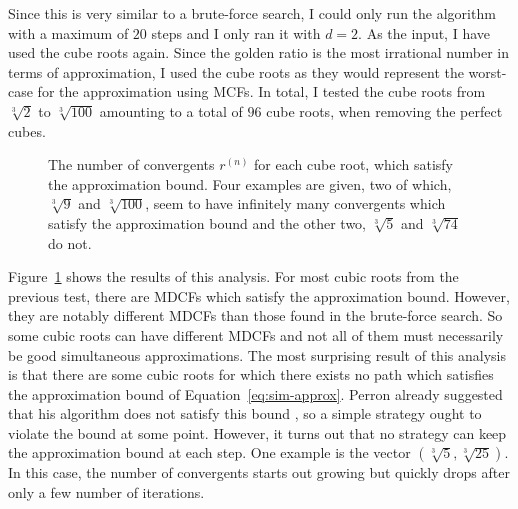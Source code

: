 Since this is very similar to a brute-force search,
I could only run the algorithm with a maximum of $20$ steps
and I only ran it with $d = 2$.
As the input, I have used the cube roots again.
Since the golden ratio is the most irrational number
in terms of approximation,
I used the cube roots as they would represent the worst-case for the
approximation using MCFs.
In total,
I tested the cube roots from $\sqrt[3]{2}$ to $\sqrt[3]{100}$ amounting to a
total of $96$ cube roots, when removing the perfect cubes.

\begin{figure}[tbp]
  \centering
  
  \caption{
    The number of convergents $r^{(n)}$ for each cube root, which
    satisfy the approximation bound.
    Four examples are given,
    two of which, $\sqrt[3]{9}$ and $\sqrt[3]{100}$, seem to have infinitely
    many convergents which satisfy the approximation bound and the other two,
    $\sqrt[3]{5}$ and $\sqrt[3]{74}$ do not.
  }
  \label{fig:results-approx}
\end{figure}

Figure~\ref{fig:results-approx} shows the results of this analysis.
For most cubic roots from the previous test,
there are MDCFs which satisfy the approximation bound.
However, they are notably different MDCFs than those found in the brute-force
search.
So some cubic roots can have different MDCFs
and not all of them must necessarily be good simultaneous approximations.
The most surprising result of this analysis is that there are some cubic roots
for which there exists no path which satisfies the approximation bound of Equation~\ref{eq:sim-approx}.
Perron already suggested that his algorithm does not satisfy this bound \cite{Perron07},
so a simple strategy ought to violate the bound at some point.
However, it turns out that no strategy can keep the approximation bound at each step.
One example is the vector $(\sqrt[3]{5}, \sqrt[3]{25})$.
In this case, the number of convergents starts out growing but quickly drops
after only a few number of iterations.

\iffalse
Since not all cubic roots can be approximated well using MDCFs,
I weakened the bound to allow all convergents which satisfy
\begin{equation}
  \label{eq:sim-approx-weak}
  \left|x_i - \frac{p_i}{q}\right| < \frac{c}{q^{1 + 1/d}} \qquad \text{ for every } i ≤ d,
\end{equation}
where $c$ is some constant independent of $n$.
The specific constant for each root is shown in Figure~\ref{fig:results-approx}.
\fi

